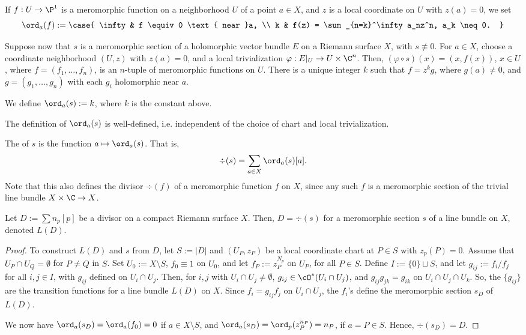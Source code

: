 \documentclass[11pt]{report}
\begin{document}
\begin{notethm}[Recall]
If $f:U \to \P^1$ is a meromorphic function on a neighborhood $U$ of a point $a \in X$, and $z$ is a local coordinate on $U$ with $z(a)=0$, we set 
\[
\ord_a(f):=\case{ \infty & f \equiv 0 \text{ near }a, \\ k & f(z) = \sum_{n=k}^\infty a_nz^n, a_k \neq 0. }
\]
\end{notethm}
Suppose now that $s$ is a meromorphic section of a holomorphic vector bundle $E$ on a Riemann surface $X$, with $s \not \equiv 0$. For $a \in X$, choose a coordinate neighborhood $(U,z)$ with $z(a)=0$, and a local trivialization $\varphi:E|_U \to U \times \C^n$. Then, $(\varphi\circ s)(x) = (x,f(x))$, $x \in U$, where $f=(f_1,\dots,f_n)$, is an $n$-tuple of meromorphic functions on $U$. There is a unique integer $k$ such that $f = z^kg$, where $g(a) \neq 0$, and $g=(g_1,\dots,g_n)$ with each $g_i$ holomorphic near $a$.

\begin{defn}
    We define $\ord_a(s):=k$, where $k$ is the constant above.
\end{defn}

\begin{exercise}
    The definition of $\ord_a(s)$ is well-defined, i.e. independent of the choice of chart and local trivialization.
\end{exercise}

\begin{defn}
    The  of $s$ is the function $a \mapsto \ord_a(s)$. That is, 
    \[
    \div(s) = \sum_{a \in X}\ord_a(s)[a]. 
    \]
    Note that this also defines the divisor $\div(f)$ of a meromorphic function $f$ on $X$, since any such $f$ is a meromorphic section of the trivial line bundle $X \times \C \to X$.
\end{defn}

\begin{lem}
    Let $D:= \sum n_p[p]$ be a divisor on a compact Riemann surface $X$. Then, $D=\div(s)$ for a meromorphic section $s$ of a line bundle on $X$, denoted $L(D)$.
\end{lem}

\begin{proof}
    To construct $L(D)$ and $s$ from $D$, let $S:= |D|$ and $(U_P,z_P)$ be a local coordinate chart at $P \in S$ with $z_p(P)=0$. Assume that $U_P \cap U_Q = \emptyset$ for $P \neq Q$ in $S$. Set $U_0 := X\setminus S$, $f_0 \equiv 1$ on $U_0$, and let $f_P:=z_P^{N_p}$ on $U_P$, for all $P \in S$. Define $I := \{0\} \sqcup S$, and let $g_{ij}:= f_i/f_j$ for all $i,j \in I$, with $g_{ij}$ defined on $U_i \cap U_j$. Then, for $i,j$ with $U_i \cap U_j \neq \emptyset$, $g_{ij} \in \cO^*(U_i \cap U_j)$, and $g_{ij}g_{jk}=g_{ik}$ on $U_i \cap U_j \cap U_k$. So, the $\{ g_{ij} \}$ are the transition functions for a line bundle $L(D)$ on $X$. Since $f_{i}=g_{ij}f_j$ on $U_i \cap U_j$, the $f_i$'s define the meromorphic section $s_D$ of $L(D)$.

    We now have $\ord_a (s_D) = \ord_a (f_0)=0$ if $a \in X\setminus S$, and $\ord_a(s_D)=\ord_p(z_P^{n_P})=n_P$, if $a = P \in S$. Hence, $\div (s_D)=D$.
\end{proof}
\end{document}
